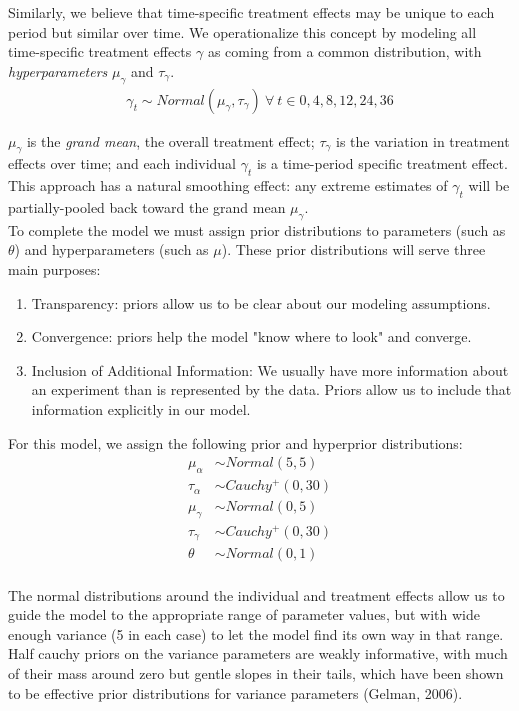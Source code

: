 \documentclass[12pt, oneside]{article}
\begin{document}
Similarly, we believe that time-specific treatment effects may be unique to each period but similar over time. We operationalize this concept by modeling all time-specific treatment effects $\gamma$ as coming from a common distribution, with \emph{hyperparameters} $\mu_{\gamma}$ and $\tau_{\gamma}$.
\begin{align}
\gamma_t \sim Normal(\mu_{\gamma}, \tau_{\gamma}) \ \forall \ t \in 0, 4, 8, 12, 24, 36
\end{align} 

$\mu_{\gamma}$ is the \emph{grand mean}, the overall treatment effect; $\tau_{\gamma}$ is the variation in treatment effects over time; and each individual $\gamma_t$ is a time-period specific treatment effect.  This approach has a natural smoothing effect: any extreme estimates of $\gamma_t$ will be partially-pooled back toward the grand mean $\mu_{\gamma}$.
\\

To complete the model we must assign prior distributions to parameters (such as $\theta$) and hyperparameters (such as $\mu$).  These prior distributions will serve three main purposes:
\begin{enumerate}
\item{Transparency: priors allow us to be clear about our modeling assumptions.}
\item{Convergence: priors help the model "know where to look" and converge.}
\item{Inclusion of Additional Information: We usually have more information about an experiment than is represented by the data.  Priors allow us to include that information explicitly in our model.}
\end{enumerate}

For this model, we assign the following prior and hyperprior distributions:
\begin{align}
\mu_{\alpha} &\sim Normal(5, 5) \\
\tau_{\alpha} &\sim Cauchy^+(0, 30) \\
\mu_{\gamma} &\sim Normal(0, 5) \\
\tau_{\gamma} &\sim Cauchy^+(0, 30) \\
\theta &\sim Normal(0, 1) \\
\end{align}

The normal distributions around the individual and treatment effects allow us to guide the model to the appropriate range of parameter values, but with wide enough variance (5 in each case) to let the model find its own way in that range.  Half cauchy priors on the variance parameters are weakly informative, with much of their mass around zero but gentle slopes in their tails, which have been shown to be effective prior distributions for variance parameters (Gelman, 2006).
\end{document}
